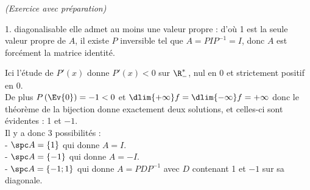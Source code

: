\documentclass[11pt]{article}%
\begin{document}
\begin{exercice}{\it (Exercice avec préparation)}
\begin{noliste}{1.}
diagonalisable elle admet au moins une valeur propre : d'où 1 est la
seule valeur propre de $A$, il existe $P$ inversible tel que $A = P I
P^{-1} = I$, donc $A$ est forcément la matrice identité. \\
 \item Ici l'étude de $P'(x)$ donne $P'(x) < 0$ sur $\R_-^*$, nul en 0
et strictement positif en 0. \\
 De plus $P\left(\Ev{0}\right) = -1 <0$ et $\dlim{+ \infty} f =
\dlim{-\infty} f = + \infty$ donc le théorème de la bijection donne
exactement deux solutions, et celles-ci sont évidentes : 1 et $-1$. \\
 Il y a donc 3 possibilités : \\
 - $\spc A = \{ 1 \}$ qui donne $A = I$. \\
 - $\spc A = \{ -1 \}$ qui donne $A = -I$. \\
 - $\spc A = \{ -1 ; 1 \}$ qui donne $A = P D P^{-1}$ avec $D$
contenant 1 et $-1$ sur sa diagonale.
 \end{noliste}
 \end{exercice}

 \newpage
\end{document}
